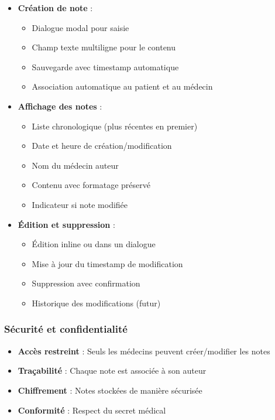 \documentclass[a4paper,11pt]{report}
\begin{document}
\begin{itemize}
    \item \textbf{Création de note} :
    \begin{itemize}
        \item Dialogue modal pour saisie
        \item Champ texte multiligne pour le contenu
        \item Sauvegarde avec timestamp automatique
        \item Association automatique au patient et au médecin
    \end{itemize}
    
    \item \textbf{Affichage des notes} :
    \begin{itemize}
        \item Liste chronologique (plus récentes en premier)
        \item Date et heure de création/modification
        \item Nom du médecin auteur
        \item Contenu avec formatage préservé
        \item Indicateur si note modifiée
    \end{itemize}
    
    \item \textbf{Édition et suppression} :
    \begin{itemize}
        \item Édition inline ou dans un dialogue
        \item Mise à jour du timestamp de modification
        \item Suppression avec confirmation
        \item Historique des modifications (futur)
    \end{itemize}
\end{itemize}

\subsubsection{Sécurité et confidentialité}

\begin{itemize}
    \item \textbf{Accès restreint} : Seuls les médecins peuvent créer/modifier les notes
    \item \textbf{Traçabilité} : Chaque note est associée à son auteur
    \item \textbf{Chiffrement} : Notes stockées de manière sécurisée
    \item \textbf{Conformité} : Respect du secret médical
\end{itemize}
\end{document}
